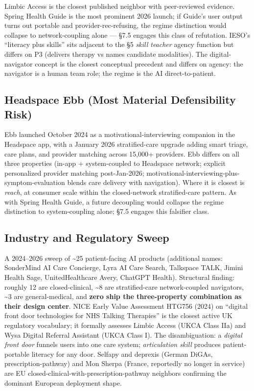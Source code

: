\documentclass[letterpaper]{article}
\begin{document}
Limbic Access is the closest published neighbor with peer-reviewed evidence. Spring Health Guide is the most prominent 2026 launch; if Guide's user output turns out portable and provider-rec-refusing, the regime distinction would collapse to network-coupling alone --- \S7.5 engages this class of refutation. IESO's ``literacy plus skills'' sits adjacent to the \S5 \emph{skill teacher} agency function but differs on P3 (delivers therapy vs names candidate modalities). The digital-navigator concept is the closest conceptual precedent and differs on agency: the navigator is a human team role; the regime is the AI direct-to-patient.

\subsection{Headspace Ebb (Most Material Defensibility Risk)}

Ebb launched October 2024 as a motivational-interviewing companion in the Headspace app, with a January 2026 stratified-care upgrade adding smart triage, care plans, and provider matching across 15,000+ providers. Ebb differs on all three properties (in-app + system-coupled to Headspace network; explicit personalized provider matching post-Jan-2026; motivational-interviewing-plus-symptom-evaluation blends care delivery with navigation). Where it is closest is \emph{reach}, at consumer scale within the closed-network stratified-care pattern. As with Spring Health Guide, a future decoupling would collapse the regime distinction to system-coupling alone; \S7.5 engages this falsifier class.

\subsection{Industry and Regulatory Sweep}

A 2024--2026 sweep of \textasciitilde25 patient-facing AI products (additional names: SonderMind AI Care Concierge, Lyra AI Care Search, Talkspace TALK, Jimini Health Sage, UnitedHealthcare Avery, ChatGPT Health). Structural finding: roughly 12 are closed-clinical, \textasciitilde8 are stratified-care network-coupled navigators, \textasciitilde3 are general-medical, and \textbf{zero ship the three-property combination as their design center}. NICE Early Value Assessment HTG756 (2024) on ``digital front door technologies for NHS Talking Therapies'' is the closest active UK regulatory vocabulary; it formally assesses Limbic Access (UKCA Class IIa) and Wysa Digital Referral Assistant (UKCA Class I). The disambiguation: a \emph{digital front door} funnels users into one care system; \emph{articulation skill} produces patient-portable literacy for any door. Selfapy and deprexis (German DiGAs, prescription-pathway) and Mon Sherpa (France, reportedly no longer in service) are EU closed-clinical-with-prescription-pathway neighbors confirming the dominant European deployment shape.
\end{document}
